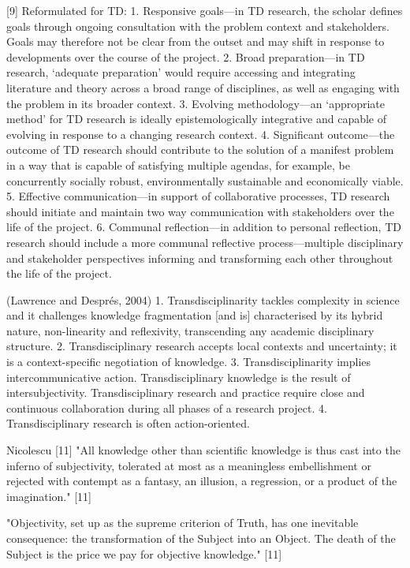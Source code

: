 [9] Reformulated for TD:
1. Responsive goals—in TD research, the scholar defines goals through ongoing consultation with the problem context and stakeholders. Goals may therefore not be clear from the outset and may shift in response to developments over the course of the project.
2. Broad preparation—in TD research, ‘adequate preparation’ would require accessing and integrating literature and theory across a broad range of disciplines, as well as engaging with the problem in its broader context.
3. Evolving methodology—an ‘appropriate method’ for TD research is ideally epistemologically integrative and capable of evolving in response to a changing research context.
4. Significant outcome—the outcome of TD research should contribute to the solution of a manifest problem in a way that is capable of satisfying multiple agendas, for example, be concurrently socially robust, environmentally sustainable and economically viable.
5. Effective communication—in support of collaborative processes, TD research should initiate and maintain two way communication with stakeholders over the life of the project.
6. Communal reflection—in addition to personal reflection, TD research should include a more communal reflective process—multiple disciplinary and stakeholder perspectives informing and transforming each other throughout the life of the project.


(Lawrence and Després, 2004)
1.	Transdisciplinarity tackles complexity in science and it challenges knowledge fragmentation [and is] characterised by its hybrid nature, non-linearity and reflexivity, transcending any academic disciplinary structure.
2.	Transdisciplinary research accepts local contexts and uncertainty; it is a context-specific negotiation of knowledge.
3.	Transdisciplinarity implies intercommunicative action. Transdisciplinary knowledge is the result of intersubjectivity. Transdisciplinary research and practice require close and continuous collaboration during all phases of a research project.
4.	Transdisciplinary research is often action-oriented.

Nicolescu [11]
"All knowledge other than scientific knowledge is thus cast into the inferno of subjectivity, tolerated at most as a meaningless embellishment or rejected with contempt as a fantasy, an illusion, a regression, or a product of the imagination."
[11]

"Objectivity, set up as the supreme criterion of Truth, has one inevitable consequence: the transformation of the Subject into an Object. The death of the Subject is the price we pay for objective knowledge." [11]

